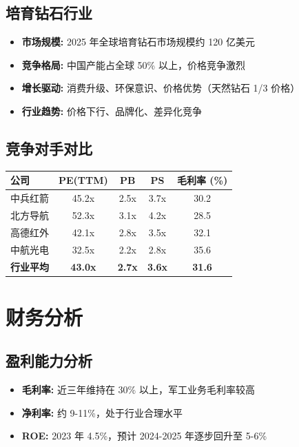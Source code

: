 \documentclass[a4paper,11pt]{article}
\begin{document}
\subsection*{培育钻石行业}
\begin{itemize}[leftmargin=*]
    \item \textbf{市场规模:} 2025 年全球培育钻石市场规模约 120 亿美元
    \item \textbf{竞争格局:} 中国产能占全球 50\% 以上，价格竞争激烈
    \item \textbf{增长驱动:} 消费升级、环保意识、价格优势（天然钻石 1/3 价格）
    \item \textbf{行业趋势:} 价格下行、品牌化、差异化竞争
\end{itemize}

\subsection*{竞争对手对比}
\begin{center}
\begin{tabular}{lcccc}
    \toprule
    \rowcolor{lightbg}
    \textbf{公司} & \textbf{PE(TTM)} & \textbf{PB} & \textbf{PS} & \textbf{毛利率 (\%)} \\
    \midrule
    中兵红箭 & 45.2x & 2.5x & 3.7x & 30.2 \\
    北方导航 & 52.3x & 3.1x & 4.2x & 28.5 \\
    高德红外 & 42.1x & 2.8x & 3.5x & 32.1 \\
    中航光电 & 32.5x & 2.2x & 2.8x & 35.6 \\
    \midrule
    \textbf{行业平均} & \textbf{43.0x} & \textbf{2.7x} & \textbf{3.6x} & \textbf{31.6} \\
    \bottomrule
\end{tabular}
\end{center}

\newpage

\section{财务分析}

\subsection*{盈利能力分析}
\begin{itemize}[leftmargin=*]
    \item \textbf{毛利率:} 近三年维持在 30\% 以上，军工业务毛利率较高
    \item \textbf{净利率:} 约 9-11\%，处于行业合理水平
    \item \textbf{ROE:} 2023 年 4.5\%，预计 2024-2025 年逐步回升至 5-6\%
\end{itemize}
\end{document}
